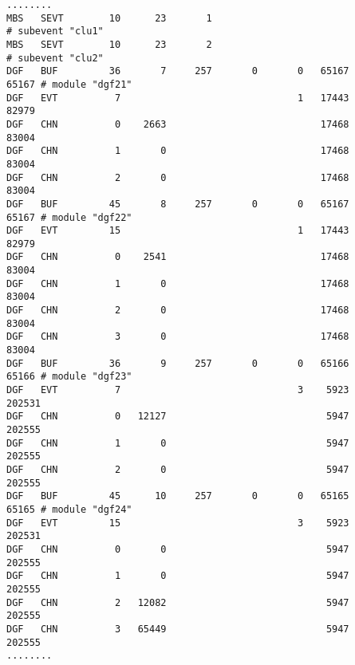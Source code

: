 \documentclass[12pt]{article}
\begin{document}
\begin{scriptsize}
\verb+........+\\
\verb+MBS   SEVT        10      23       1                                         # subevent "clu1"+\\
\verb+MBS   SEVT        10      23       2                                         # subevent "clu2"+\\
\verb+DGF   BUF         36       7     257       0       0   65167           65167 # module "dgf21"+\\
\verb+DGF   EVT          7                               1   17443           82979+\\
\verb+DGF   CHN          0    2663                           17468           83004+\\
\verb+DGF   CHN          1       0                           17468           83004+\\
\verb+DGF   CHN          2       0                           17468           83004+\\
\verb+DGF   BUF         45       8     257       0       0   65167           65167 # module "dgf22"+\\
\verb+DGF   EVT         15                               1   17443           82979+\\
\verb+DGF   CHN          0    2541                           17468           83004+\\
\verb+DGF   CHN          1       0                           17468           83004+\\
\verb+DGF   CHN          2       0                           17468           83004+\\
\verb+DGF   CHN          3       0                           17468           83004+\\
\verb+DGF   BUF         36       9     257       0       0   65166           65166 # module "dgf23"+\\
\verb+DGF   EVT          7                               3    5923          202531+\\
\verb+DGF   CHN          0   12127                            5947          202555+\\
\verb+DGF   CHN          1       0                            5947          202555+\\
\verb+DGF   CHN          2       0                            5947          202555+\\
\verb+DGF   BUF         45      10     257       0       0   65165           65165 # module "dgf24"+\\
\verb+DGF   EVT         15                               3    5923          202531+\\
\verb+DGF   CHN          0       0                            5947          202555+\\
\verb+DGF   CHN          1       0                            5947          202555+\\
\verb+DGF   CHN          2   12082                            5947          202555+\\
\verb+DGF   CHN          3   65449                            5947          202555+\\
\verb+........+\\
\end{scriptsize}
\end{document}
